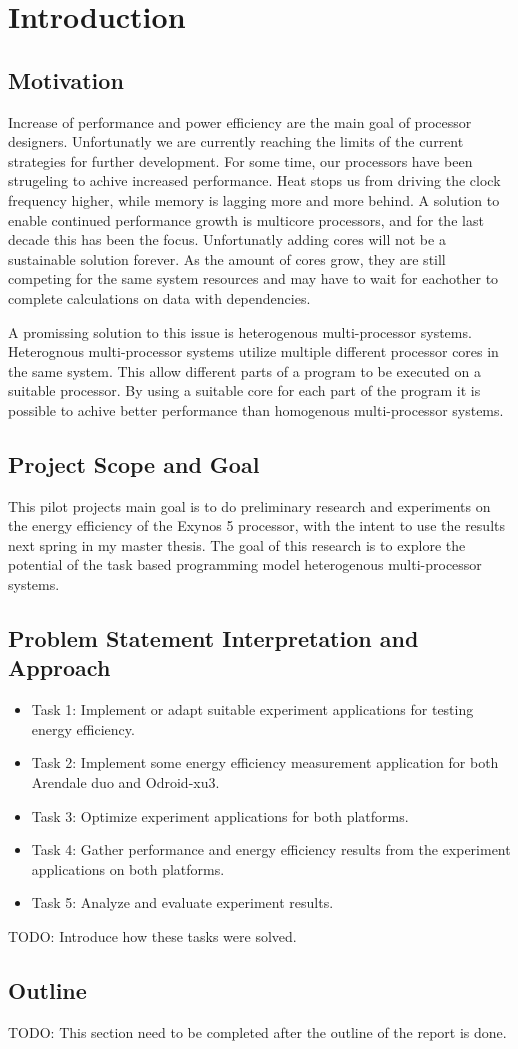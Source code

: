 \chapter[Introduction]{Introduction}
\section{Motivation}
Increase of performance and power efficiency are the main goal of processor designers.
Unfortunatly we are currently reaching the limits of the current strategies for further development.
For some time, our processors have been strugeling to achive increased performance.
Heat stops us from driving the clock frequency higher, while memory is lagging more and more behind.
A solution to enable continued performance growth is multicore processors, and for the last decade this has been the focus.
Unfortunatly adding cores will not be a sustainable solution forever.
As the amount of cores grow, they are still competing for the same system resources and may have to wait for eachother to complete calculations on data with dependencies.

A promissing solution to this issue is heterogenous multi-processor systems.
Heterognous multi-processor systems utilize multiple different processor cores in the same system.
This allow different parts of a program to be executed on a suitable processor.
By using a suitable core for each part of the program it is possible to achive better performance than homogenous multi-processor systems.

\section{Project Scope and Goal}
This pilot projects main goal is to do preliminary research and experiments on the energy efficiency of the Exynos 5 processor, with the intent to use the results next spring in my master thesis.
The goal of this research is to explore the potential of the task based programming model heterogenous multi-processor systems.

\section{Problem Statement Interpretation and Approach}
\begin{itemize}
  \item Task 1: Implement or adapt suitable experiment applications for testing energy efficiency.
  \item Task 2: Implement some energy efficiency measurement application for both Arendale duo and Odroid-xu3.
  \item Task 3: Optimize experiment applications for both platforms.
  \item Task 4: Gather performance and energy efficiency results from the experiment applications on both platforms.
  \item Task 5: Analyze and evaluate experiment results.
\end{itemize}

TODO: Introduce how these tasks were solved.

\section{Outline}
TODO: This section need to be completed after the outline of the report is done.
